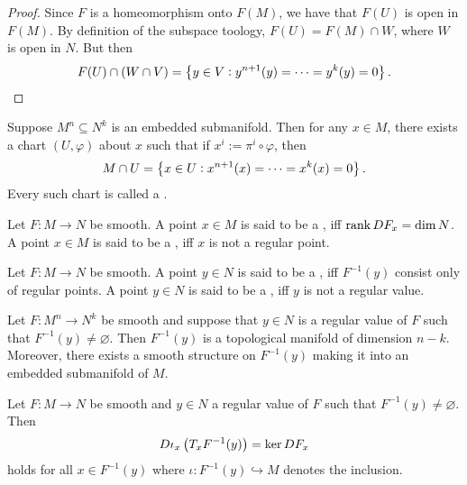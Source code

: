 \begin{proof}
	Since $F$ is a homeomorphism onto $F(M)$, we have that $F(U)$ is open in $F(M)$. By definition of the subspace toology, $F(U) = F(M) \cap W$, where $W$ is open in $N$. But then
	\begin{equation*}
		F(U) \cap (W \cap V) = \cbr[1]{y \in V : y^{n + 1}(y) = \dots = y^k(y)= 0}. 
	\end{equation*}
\end{proof}

\begin{corollary}
	Suppose $M^n \subseteq N^k$ is an embedded submanifold. Then for any $x \in M$, there exists a chart $(U,\varphi)$ about $x$ such that if $x^i := \pi^i \circ \varphi$, then
	\begin{equation*}
		M \cap U = \cbr[1]{x \in U : x^{n + 1}(x) = \dots = x^k(x)= 0}. 
	\end{equation*}
	Every such chart is called a .
\end{corollary}

\begin{definition}
	Let $F : M \to N$ be smooth. A point $x \in M$ is said to be a , iff $\operatorname{rank} DF_x = \dim N$. A point $x \in M$ is said to be a , iff $x$ is not a regular point. 
\end{definition}

\begin{definition}
	Let $F : M \to N$ be smooth. A point $y \in N$ is said to be a , iff $F^{-1}(y)$ consist only of regular points. A point $y \in N$ is said to be a , iff $y$ is not a regular value. 
\end{definition}

\begin{theorem}
	\label{thm:implicit_function_theorem_for_manifolds}
	Let $F : M^n \to N^k$ be smooth and suppose that $y \in N$ is a regular value of $F$ such that $F^{-1}(y) \neq \varnothing$. Then $F^{-1}(y)$ is a topological manifold of dimension $n - k$. Moreover, there exists a smooth structure on $F^{-1}(y)$ making it into an embedded submanifold of $M$.
\end{theorem}

\begin{proposition}
	Let $F : M \to N$ be smooth and $y \in N$ a regular value of $F$ such that $F^{-1}(y) \neq \varnothing$. Then
	\begin{equation*}
		D\iota_x\del[1]{T_xF^{-1}(y)} = \ker DF_x
	\end{equation*}
	\noindent holds for all $x \in F^{-1}(y)$ where $\iota : F^{-1}(y) \hookrightarrow M$ denotes the inclusion.
\end{proposition}

